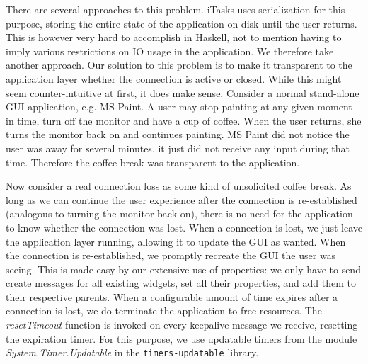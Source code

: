 \documentclass[11pt,a4paper]{article}
\begin{document}
There are several approaches to this problem.
iTasks uses serialization for this purpose, storing the entire state of the application on disk until the user returns.
This is however very hard to accomplish in Haskell, not to mention having to imply various restrictions on IO usage in the application.
We therefore take another approach.
Our solution to this problem is to make it transparent to the application layer whether the connection is active or closed.
While this might seem counter-intuitive at first, it does make sense.
Consider a normal stand-alone GUI application, e.g. MS Paint.
A user may stop painting at any given moment in time, turn off the monitor and have a cup of coffee.
When the user returns, she turns the monitor back on and continues painting.
MS Paint did not notice the user was away for several minutes, it just did not receive any input during that time.
Therefore the coffee break was transparent to the application.

Now consider a real connection loss as some kind of unsolicited coffee break.
As long as we can continue the user experience after the connection is re-established (analogous to turning the monitor back on), there is no need for the application to know whether the connection was lost.
When a connection is lost, we just leave the application layer running, allowing it to update the GUI as wanted.
When the connection is re-established, we promptly recreate the GUI the user was seeing.
This is made easy by our extensive use of properties: we only have to send create messages for all existing widgets, set all their properties, and add them to their respective parents.
When a configurable amount of time expires after a connection is lost, we do terminate the application to free resources.
The \textit{resetTimeout} function is invoked on every keepalive message we receive, resetting the expiration timer.
For this purpose, we use updatable timers from the module \textit{System.Timer.Updatable} in the \texttt{timers-updatable} library.
\end{document}
